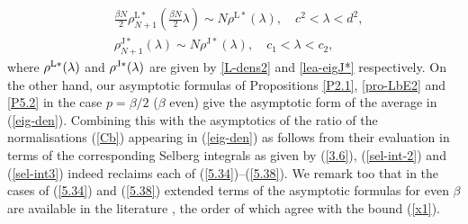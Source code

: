 \documentclass[11pt,a4paper]{article}
\numberwithin{equation}{section} %
\theoremstyle{plain}
\theoremstyle{definition}
\numberwithin{prop}{section}
\numberwithin{cor}{section}
\numberwithin{remark}{section}
\begin{document}
\begin{align}
    &\frac{\beta N}{2}\rho_{N+1}^{\mathrm{L}*}\left(\frac{\beta N}{2}\lambda\right)\sim N\rho^{\mathrm{L}*}(\lambda),\quad c^2<\lambda<d^2,\\
    &\rho_{N+1}^{\mathrm{J}*}(\lambda)\sim N\rho^{\mathrm{J}*}(\lambda),\quad c_1<\lambda<c_2, \label{5.38}
\end{align}
where $\rho^{\rm L*}(\lambda)$ and $\rho^{\rm J*}(\lambda)$ are given by \eqref{L-dens2} and \eqref{lea-eigJ*} respectively. 
On the other hand, our asymptotic formulas of Propositions \ref{P2.1}, \ref{pro-LbE2}
and \ref{P5.2} in the case $p=\beta/2$ ($\beta$ even) give the asymptotic form of the
average in (\ref{eig-den}). Combining this with the asymptotics of the ratio of
the normalisations (\ref{Cb}) appearing in (\ref{eig-den}) as follows from their
evaluation in terms of the corresponding Selberg integrals as given by (\ref{3.6}),
(\ref{sel-int-2}) and (\ref{sel-int3}) indeed reclaims each of (\ref{5.34})--(\ref{5.38}). We remark too that in the cases of (\ref{5.34}) and (\ref{5.38}) extended terms of the asymptotic formulas for even $\beta$ are available in the literature \cite{DF06}, the order of which agree with the bound (\ref{x1}).
\end{document}
